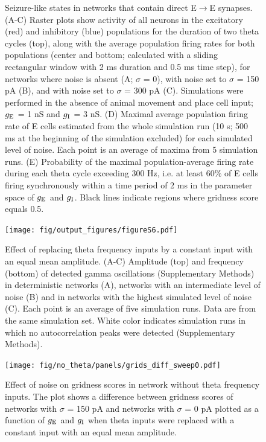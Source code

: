 \documentclass[a4paper,12pt]{article}
\newcommand{\ssc}[3]{\ensuremath{#1_{\text{#2}_{\text{#3}}}}}
\newcommand{\gE      }{\ssc{g}      {\scriptsize{E}}{}}
\newcommand{\gI      }{\ssc{g}      {\scriptsize{I}}{}}
\begin{document}
\begin{figure}[H]
    \internallinenumbers
    \caption{Seizure-like states in networks that contain direct
    E$\rightarrow$E synapses. (A-C) Raster plots show activity of all neurons
    in the excitatory (red) and inhibitory (blue) populations for the duration
    of two theta cycles (top), along with the average population firing rates
    for both populations (center and bottom; calculated with a sliding
    rectangular window with 2 ms duration and 0.5 ms time step), for networks
    where noise is absent (A; $\sigma$ = 0), with noise set to $\sigma$ = 150
    pA (B), and with noise set to $\sigma$ = 300 pA (C). Simulations were
    performed in the absence of animal movement and place cell input; $\gE$ = 1 nS
    and $\gI$ = 3 nS.  (D) Maximal average population firing rate of E cells
    estimated from the whole simulation run (10 s; 500 ms at the beginning of
    the simulation excluded) for each simulated level of noise. Each point is
    an average of maxima from 5 simulation runs.  (E) Probability of the
    maximal population-average firing rate during each theta cycle exceeding
    300 Hz, i.e. at least 60\% of E cells firing synchronously within a time
    period of 2 ms in the parameter space of $\gE$ and $\gI$. Black lines indicate
    regions where gridness score equals 0.5.}
\end{figure}

\clearpage


\setcounter{figure}{0}
\renewcommand{\figurename}{Figure 6 - figure supplement}

\begin{figure}[ht!]
    \internallinenumbers
    \centering
        \texttt{[image: fig/output\_figures/figureS6.pdf]}
    \caption{Effect of replacing theta frequency inputs by a constant input
    with an equal mean amplitude. (A-C) Amplitude (top) and frequency (bottom)
    of detected gamma oscillations (Supplementary Methods) in deterministic
    networks (A), networks with an intermediate level of noise (B) and in
    networks with the highest simulated level of noise (C). Each point is an
    average of five simulation runs. Data are from the same simulation set.
    White color indicates simulation runs in which no autocorrelation peaks
    were detected (Supplementary Methods).}
\end{figure}

\clearpage

\begin{figure}[ht!]
    \internallinenumbers
    \centering
        \texttt{[image: fig/no\_theta/panels/grids\_diff\_sweep0.pdf]}
    \caption{Effect of noise on gridness scores in network without theta
    frequency inputs. The plot shows a difference between gridness scores
    of networks with $\sigma$ = 150 pA and networks with $\sigma$ = 0 pA
    plotted as a function of $\gE$ and $\gI$ when theta inputs were replaced
    with a constant input with an equal mean amplitude.}
\end{figure}
\end{document}
